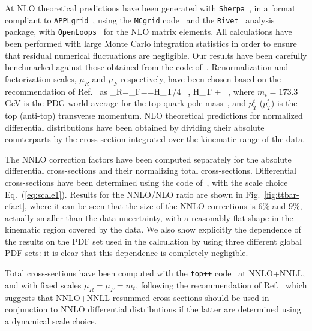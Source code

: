 At NLO theoretical predictions have been generated with {\tt Sherpa}~\cite{Gleisberg:2008ta}, in a format 
compliant to {\tt APPLgrid}~\cite{Carli:2010rw}, using
the {\tt MCgrid} 
code~\cite{DelDebbio:2013kxa} and the {\tt Rivet}~\cite{Buckley:2010ar} 
analysis package, with {\tt OpenLoops}~\cite{Cascioli:2011va} for the NLO 
matrix elements. 
%
All calculations have been performed with large Monte Carlo integration 
statistics in order to ensure that residual numerical fluctuations are 
negligible.
%
Our results have been carefully benchmarked against those obtained from 
the code of~\cite{Czakon:2016dgf}.
%
Renormalization and factorization scales, $\mu_R$ and $\mu_F$
respectively, have 
been chosen based on the recommendation of Ref.~\cite{Czakon:2016dgf} as
\be
\label{eq:scale1}
\mu_R=\mu_F=\mu=H_T/4 \, , \qquad H_T \equiv {}
+  \, ,
\ee
where $m_t=173.3$ GeV is the PDG world average for the
top-quark pole mass~\cite{Agashe:2014kda},
and $p_T^t$ ($p_T^{\bar{t}}$) is the top (anti-top) transverse momentum.
NLO theoretical predictions for normalized differential distributions have been obtained
by dividing their absolute counterparts by the cross-section
integrated over the kinematic range of the data.


The NNLO correction factors have been computed separately
for the absolute  differential cross-sections and their normalizing total cross-sections. 
%
Differential cross-sections have been determined using the 
code of~\cite{Czakon:2016dgf}, with the scale choice Eq.~(\ref{eq:scale1}).
%
Results for the NNLO/NLO ratio are shown in
Fig.~\ref{fig:ttbar-cfact}, where it can be seen that the size of the
NNLO corrections is $6\%$ and $9\%$, actually smaller
than the data uncertainty, with a reasonably flat shape in the kinematic
region covered by the data.
We also show explicitly the dependence of the results on the PDF set
used in the calculation by using three different global PDF sets: it
is clear that this dependence is completely negligible.

Total cross-sections have been computed with the {\tt top++}
code~\cite{Czakon:2011xx} at NNLO+NNLL, and with fixed scales
$\mu_R=\mu_F=m_t$, following the recommendation of
Ref.~\cite{Czakon:2016dgf} which suggests that NNLO+NNLL resummed
cross-sections should be used in conjunction to NNLO differential
distributions if the latter are determined using a dynamical scale choice.


%

